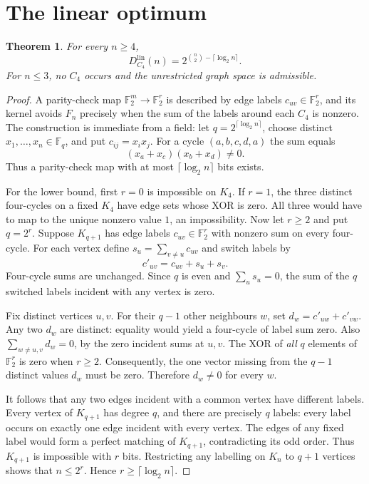 \documentclass[11pt,a4paper]{article}
\newtheorem{theorem}{Theorem}
\newcommand{\F}{\mathbb{F}}
\begin{document}
\section{The linear optimum}
\begin{theorem}\label{thm:linear}
For every $n\ge4$,
\[
\boxed{D_{C_4}^{\mathrm{lin}}(n)=2^{\binom n2-\lceil\log_2n\rceil}.}
\]
For $n\le3$, no $C_4$ occurs and the unrestricted graph space is admissible.
\end{theorem}
\begin{proof}
A parity-check map $\F_2^m\to\F_2^r$ is described by edge labels $c_{uv}\in\F_2^r$, and its kernel avoids $F_n$ precisely when the sum of the labels around each $C_4$ is nonzero. The construction is immediate from a field: let $q=2^{\lceil\log_2 n\rceil}$, choose distinct $x_1,\ldots,x_n\in\F_q$, and put $c_{ij}=x_ix_j$. For a cycle $(a,b,c,d,a)$ the sum equals
\[
  (x_a+x_c)(x_b+x_d)\ne0.
\]
Thus a parity-check map with at most $\lceil\log_2 n\rceil$ bits exists.

For the lower bound, first $r=0$ is impossible on $K_4$. If $r=1$, the three distinct four-cycles on a fixed $K_4$ have edge sets whose XOR is zero. All three would have to map to the unique nonzero value $1$, an impossibility. Now let $r\ge2$ and put $q=2^r$. Suppose $K_{q+1}$ has edge labels $c_{uv}\in\F_2^r$ with nonzero sum on every four-cycle. For each vertex define $s_u=\sum_{v\ne u}c_{uv}$ and switch labels by
\[
 c'_{uv}=c_{uv}+s_u+s_v.
\]
Four-cycle sums are unchanged. Since $q$ is even and $\sum_u s_u=0$, the sum of the $q$ switched labels incident with any vertex is zero.

Fix distinct vertices $u,v$. For their $q-1$ other neighbours $w$, set $d_w=c'_{uw}+c'_{vw}$. Any two $d_w$ are distinct: equality would yield a four-cycle of label sum zero. Also $\sum_{w\ne u,v}d_w=0$, by the zero incident sums at $u,v$. The XOR of \emph{all} $q$ elements of $\F_2^r$ is zero when $r\ge2$. Consequently, the one vector missing from the $q-1$ distinct values $d_w$ must be zero. Therefore $d_w\ne0$ for every $w$.

It follows that any two edges incident with a common vertex have different labels. Every vertex of $K_{q+1}$ has degree $q$, and there are precisely $q$ labels: every label occurs on exactly one edge incident with every vertex. The edges of any fixed label would form a perfect matching of $K_{q+1}$, contradicting its odd order. Thus $K_{q+1}$ is impossible with $r$ bits. Restricting any labelling on $K_n$ to $q+1$ vertices shows that $n\le2^r$. Hence $r\ge\lceil\log_2n\rceil$.
\end{proof}
\end{document}
